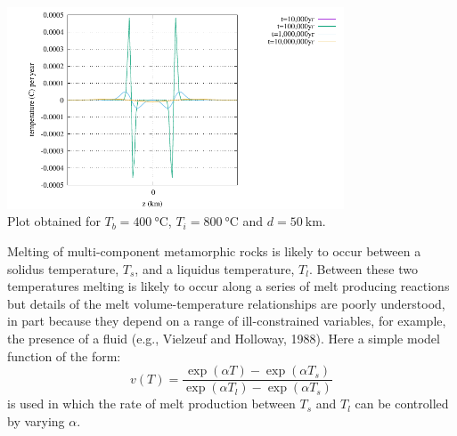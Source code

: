 \begin{center}
\includegraphics[width=10cm]{python_codes/fieldstone_169/images/solution_derv.pdf}\\
{\captionfont Plot obtained for $T_b=400~\si{\celsius}$, $T_i=800~\si{\celsius}$ and $d=50~\si{\km}$.}
\end{center}


Melting of multi-component metamorphic rocks is likely to occur between a solidus
temperature, $T_s$, and a liquidus temperature, $T_l$.
Between these two temperatures melting is likely
to occur along a series of melt producing reactions but details of the melt volume-temperature
relationships are poorly understood, in part because they depend on a range of ill-constrained
variables, for example, the presence of a fluid
(e.g., Vielzeuf and Holloway, 1988). Here a simple model function of the form:
\begin{equation}
v(T) = \frac{\exp(\alpha T)- \exp(\alpha T_s) }{\exp(\alpha T_l) - \exp(\alpha T_s) }
\label{eq:stuw95_eq3}
\end{equation}
is used in which the rate of melt production between $T_s$ and $T_l$ can be controlled by varying $\alpha$.



